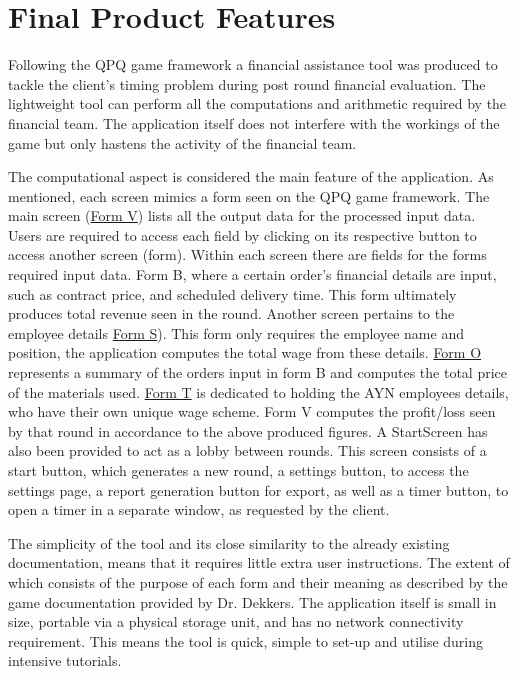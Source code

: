 \documentclass{l3proj}
\begin{document}
\section{Final Product Features}
\label{sec:finalproduct}
Following the QPQ game framework a financial assistance tool was produced to tackle the client's timing problem during post round financial evaluation. The lightweight tool can perform all the computations and arithmetic required by the financial team. The application itself does not interfere with the workings of the game but only hastens the activity of the financial team.

The computational aspect is considered the main feature of the application. As mentioned, each screen mimics a form seen on the QPQ game framework. The main screen (\hyperref[fig:FormV]{Form V}) lists all the output data for the processed input data. Users are required to access each field by clicking on its respective button to access another screen (form). Within each screen there are fields for the forms required input data. Form B, where a certain order's financial details are input, such as contract price, and scheduled delivery time. This form ultimately produces total revenue seen in the round. Another screen pertains to the employee details \hyperref[fig:FormS]{Form S}). This form only requires the employee name and position, the application computes the total wage from these details. \hyperref[fig:FormO]{Form O} represents a summary of the orders input in form B and computes the total price of the materials used. \hyperref[fig:FormT]{Form T} is dedicated to holding the AYN employees details, who have their own unique wage scheme. Form V computes the profit/loss seen by that round in accordance to the above produced figures. A StartScreen has also been provided to act as a lobby between rounds. This screen consists of a start button, which generates a new round, a settings button, to access the settings page, a report generation button for export, as well as a timer button, to open a timer in a separate window, as requested by the client.

The simplicity of the tool and its close similarity to the already existing documentation, means that it requires little extra user instructions. The extent of which consists of the purpose of each form and their meaning as described by the game documentation provided by Dr. Dekkers. The application itself is small in size, portable via a physical storage unit, and has no network connectivity requirement. This means the tool is quick, simple to set-up and utilise during intensive tutorials.
\end{document}
